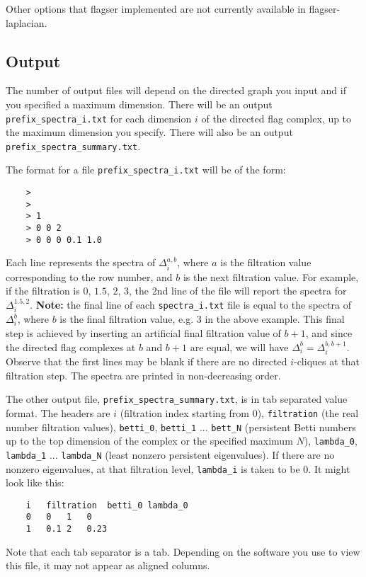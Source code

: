 \documentclass{article}
\begin{document}
Other options that flagser implemented are not currently available in flagser-laplacian.


\subsection{Output}

The number of output files will depend on the directed graph you input and if you specified a maximum dimension. There will be an output \verb|prefix_spectra_i.txt| for each dimension $i$ of the directed flag complex, up to the maximum dimension you specify. There will also be an output \verb|prefix_spectra_summary.txt|. 

The format for a file \verb|prefix_spectra_i.txt| will be of the form:

\begin{verbatim}
    >
    > 
    > 1
    > 0 0 2
    > 0 0 0 0.1 1.0
\end{verbatim}

Each line represents the spectra of  $\Delta^{a,b}_i$, where $a$ is the filtration value corresponding to the row number, and $b$ is the next filtration value. For example, if the filtration is $0$, $1.5$, $2$, $3$, the 2nd line of the file will report the spectra for $\Delta^{1.5,2}_i$. \textbf{Note:} the final line of each \verb|spectra_i.txt| file is equal to the spectra of $\Delta^b_i$, where $b$ is the final filtration value, e.g. $3$ in the above example. This final step is achieved by inserting an artificial final filtration value of $b+1$, and since the directed flag complexes at $b$ and $b+1$ are equal, we will have $\Delta^b_i = \Delta^{b,b+1}_i$. Observe that the first lines may be blank if there are no directed $i$-cliques at that filtration step. The spectra are printed in non-decreasing order. 

The other output file, \verb|prefix_spectra_summary.txt|, is in tab separated value format. The headers are $i$ (filtration index starting from $0$), \verb|filtration| (the real number filtration values), \verb|betti_0|, \verb|betti_1| ... \verb|bett_N| (persistent Betti numbers up to the top dimension of the complex or the specified maximum $N$), \verb|lambda_0|, \verb|lambda_1| ... \verb|lambda_N| (least nonzero persistent eigenvalues). If there are no nonzero eigenvalues, at that filtration level, \verb|lambda_i| is taken to be $0$. It might look like this:

\begin{verbatim}
    i   filtration  betti_0 lambda_0
    0   0   1   0
    1   0.1 2   0.23
\end{verbatim}

Note that each tab separator is a tab. Depending on the software you use to view this file, it may not appear as aligned columns.


\end{document}
